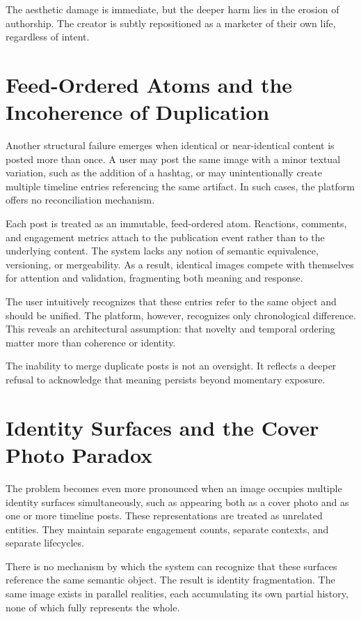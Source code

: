 \documentclass[11pt,oneside]{article}
\begin{document}
The aesthetic damage is immediate, but the deeper harm lies in the erosion of authorship. The creator is subtly repositioned as a marketer of their own life, regardless of intent.

\section{Feed-Ordered Atoms and the Incoherence of Duplication}

Another structural failure emerges when identical or near-identical content is posted more than once. A user may post the same image with a minor textual variation, such as the addition of a hashtag, or may unintentionally create multiple timeline entries referencing the same artifact. In such cases, the platform offers no reconciliation mechanism.

Each post is treated as an immutable, feed-ordered atom. Reactions, comments, and engagement metrics attach to the publication event rather than to the underlying content. The system lacks any notion of semantic equivalence, versioning, or mergeability. As a result, identical images compete with themselves for attention and validation, fragmenting both meaning and response.

The user intuitively recognizes that these entries refer to the same object and should be unified. The platform, however, recognizes only chronological difference. This reveals an architectural assumption: that novelty and temporal ordering matter more than coherence or identity.

The inability to merge duplicate posts is not an oversight. It reflects a deeper refusal to acknowledge that meaning persists beyond momentary exposure.

\section{Identity Surfaces and the Cover Photo Paradox}

The problem becomes even more pronounced when an image occupies multiple identity surfaces simultaneously, such as appearing both as a cover photo and as one or more timeline posts. These representations are treated as unrelated entities. They maintain separate engagement counts, separate contexts, and separate lifecycles.

There is no mechanism by which the system can recognize that these surfaces reference the same semantic object. The result is identity fragmentation. The same image exists in parallel realities, each accumulating its own partial history, none of which fully represents the whole.
\end{document}
